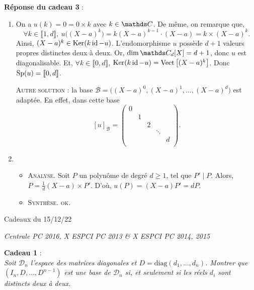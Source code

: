 \documentclass[a4paper]{article}
\begin{document}
	\bigskip
	\bigskip
	\textbf{Réponse du cadeau 3} :\\
	\begin{enumerate}[label=(\alph*)]
		\item On a $u(k) = 0 = 0 \times k$\/ avec $k \in \C$.
			De même, on remarque que, \[
				\forall k \in \llbracket 1,d \rrbracket,\: u\big((X-a)^k\big) = k (X-a)^{k-1} \cdot (X-a) = k \times (X-a)^{k}
			.\] Ainsi, $(X-a)^k \in \operatorname{Ker}(k \operatorname{id} - u)$.
			L'endomorphisme $u$\/ possède $d+1$\/ valeurs propres distinctes deux à deux. Or, $\dim \C_d[X] = d + 1$, donc $u$\/ est diagonalisable.
			Et, $\forall k \in \llbracket 0,d \rrbracket$, $\operatorname{Ker}(k \operatorname{id} - u) = \operatorname{Vect}\big[(X-a)^k\big]$. Donc $\operatorname{Sp}(u) = \llbracket 0,d \rrbracket$.

			\textsc{Autre solution} : la base $\mathcal{B} = \big((X-a)^0,(X-a)^1,\ldots,(X-a)^d\big)$\/ est adaptée. En effet, dans cette base \[
				[u]_{\mathcal{B}} = \begin{pmatrix}
					0 & & & & \\
					& 1 & & & \\
					& & 2 & & \\
					& & & \ddots & \\
					& & & & d \\
				\end{pmatrix}
			.\]
		\item
			\begin{itemize}
				\item \textsc{Analyse}. Soit $P$\/ un polynôme de degré $d \ge 1$, tel que $P'  \mid P$.
					Alors, $P = \frac{1}{d} (X-a) \times P'$.
					D'où, $u(P) = (X-a) P' = d P$.
				\item \textsc{Synthèse}. \textsc{ok}.
			\end{itemize}
	\end{enumerate}
	\clearpage
	\centerline{\LARGE Cadeaux du 15/12/22}
	\centerline{\textit{Centrale PC 2016, X ESPCI PC 2013 \& X ESPCI PC 2014, 2015}}

	\bigskip
	\bigskip
	\textbf{Cadeau 1} :\\
	\textsl{ Soit $\mathcal{D}_n$\/ l'espace des matrices diagonales et $D = \mathrm{diag}(d_1, \ldots, d_n)$.
	Montrer que $(I_n, D, \ldots, D^{n-1})$\/ est une base de $\mathcal{D}_n$\/ si, et seulement si les réels $d_i$\/ sont distincts deux à deux.}
\end{document}
